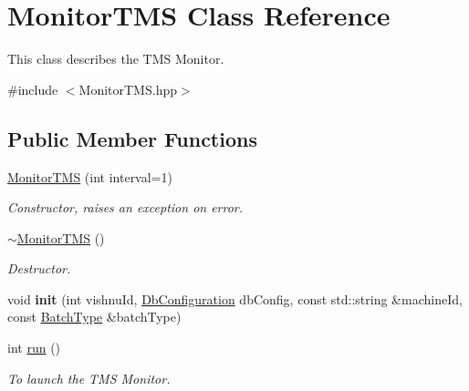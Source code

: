 \hypertarget{classMonitorTMS}{
\section{MonitorTMS Class Reference}
\label{classMonitorTMS}
}


This class describes the TMS Monitor.  




{\ttfamily \#include $<$MonitorTMS.hpp$>$}

\subsection*{Public Member Functions}
\begin{DoxyCompactItemize}
\item 
\hyperlink{classMonitorTMS_ab53b703c3d2cacdd053b804bcaa70d5f}{MonitorTMS} (int interval=1)
\begin{DoxyCompactList}\small\item\em Constructor, raises an exception on error. \item\end{DoxyCompactList}\item 
\hypertarget{classMonitorTMS_a934fc0500ed0c177ff70832f1a067321}{
\hyperlink{classMonitorTMS_a934fc0500ed0c177ff70832f1a067321}{$\sim$MonitorTMS} ()}
\label{classMonitorTMS_a934fc0500ed0c177ff70832f1a067321}

\begin{DoxyCompactList}\small\item\em Destructor. \item\end{DoxyCompactList}\item 
\hypertarget{classMonitorTMS_ab476b3c94d741da1f571979223eb0c8d}{
void {\bfseries init} (int vishnuId, \hyperlink{classDbConfiguration}{DbConfiguration} dbConfig, const std::string \&machineId, const \hyperlink{utilVishnu_8hpp_a864d748e7097d176552dd4c7635016ea}{BatchType} \&batchType)}
\label{classMonitorTMS_ab476b3c94d741da1f571979223eb0c8d}

\item 
int \hyperlink{classMonitorTMS_a92a3754d82bd306ae2964db45c8774ef}{run} ()
\begin{DoxyCompactList}\small\item\em To launch the TMS Monitor. \item\end{DoxyCompactList}\end{DoxyCompactItemize}
